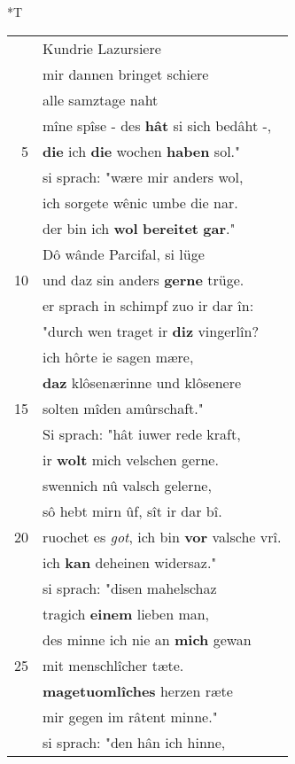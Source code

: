 \documentclass[8pt,a4paper,notitlepage]{article}
\begin{document}
\begin{table}[ht]
\begin{minipage}[t]{0.5\linewidth}
\end{minipage}
\hspace{0.5cm}
\begin{minipage}[t]{0.5\linewidth}
\small
\begin{center}*T
\end{center}
\begin{tabular}{rl}
 & Kundrie Lazursiere\\ 
 & mir dannen bringet schiere\\ 
 & alle samztage naht\\ 
 & mîne spîse - des \textbf{hât} si sich bedâht -,\\ 
5 & \textbf{die} ich \textbf{die} wochen \textbf{haben} sol."\\ 
 & si sprach: "wære mir anders wol,\\ 
 & ich sorgete wênic umbe die nar.\\ 
 & der bin ich \textbf{wol} \textbf{bereitet} \textbf{gar}."\\ 
 & Dô wânde Parcifal, si lüge\\ 
10 & und daz sin anders \textbf{gerne} trüge.\\ 
 & er sprach in schimpf zuo ir dar în:\\ 
 & "durch wen traget ir \textbf{diz} vingerlîn?\\ 
 & ich hôrte ie sagen mære,\\ 
 & \textbf{daz} klôsenærinne und klôsenere\\ 
15 & solten mîden amûrschaft."\\ 
 & Si sprach: "hât iuwer rede kraft,\\ 
 & ir \textbf{wolt} mich velschen gerne.\\ 
 & swennich nû valsch gelerne,\\ 
 & sô hebt mirn ûf, sît ir dar bî.\\ 
20 & ruochet es \textit{got}, ich bin \textbf{vor} valsche vrî.\\ 
 & ich \textbf{kan} deheinen widersaz."\\ 
 & si sprach: "disen mahelschaz\\ 
 & tragich \textbf{einem} lieben man,\\ 
 & des minne ich nie an \textbf{mich} gewan\\ 
25 & mit menschlîcher tæte.\\ 
 & \textbf{magetuomlîches} herzen ræte\\ 
 & mir gegen im râtent minne."\\ 
 & si sprach: "den hân ich hinne,\\ 

\end{tabular}
\end{minipage}
\end{table}
\end{document}

